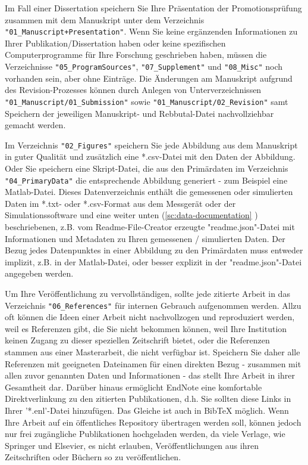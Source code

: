 Im Fall einer Dissertation speichern Sie Ihre Präsentation der Promotionsprüfung zusammen mit dem Manuskript unter dem Verzeichnis \texttt{"01\_Manuscript+Presentation"}. Wenn Sie keine ergänzenden Informationen zu Ihrer Publikation/Dissertation haben oder keine spezifischen Computerprogramme für Ihre Forschung geschrieben haben, müssen die Verzeichnisse \linebreak
\texttt{"05\_ProgramSources"}, \texttt{"07\_Supplement"} und \texttt{"08\_Misc"} noch vorhanden sein, aber ohne Einträge. Die Änderungen am Manuskript aufgrund des Revision-Prozesses können durch Anlegen von Unterverzeichnissen \texttt{"01\_Manuscript/01\_Submission"} sowie \texttt{"01\_Manuscript/02\_Revision"} samt Speichern der jeweiligen Manuskript- und Rebbutal-Datei nachvollziehbar gemacht werden.

Im Verzeichnis \texttt{"02\_Figures"} speichern Sie jede Abbildung aus dem Manuskript in guter Qualität und zusätzlich eine *.csv-Datei mit den Daten der Abbildung. Oder Sie speichern eine Skript-Datei, die aus den Primärdaten im Verzeichnis \texttt{"04\_PrimaryData"} die entsprechende Abbildung generiert - zum Beispiel eine Matlab-Datei. Dieses Datenverzeichnis enthält die gemessenen oder simulierten Daten im *.txt- oder *.csv-Format aus dem Messgerät oder der Simulationssoftware und eine weiter unten (\ref{sc:data-documentation}  ) beschriebenen, z.B. vom Readme-File-Creator erzeugte "readme.json"-Datei mit Informationen und Metadaten zu Ihren gemessenen / simulierten Daten. Der Bezug jedes Datenpunktes in einer Abbildung zu den Primärdaten muss entweder implizit, z.B. in der Matlab-Datei, oder besser explizit in der "readme.json"-Datei angegeben werden.

Um Ihre Veröffentlichung zu vervollständigen, sollte jede zitierte Arbeit in das Verzeichnis \texttt{"06\_References"} für internen Gebrauch aufgenommen werden. Allzu oft können die Ideen einer Arbeit nicht nachvollzogen und reproduziert werden, weil es Referenzen gibt, die Sie nicht bekommen können, weil Ihre
Institution keinen Zugang zu dieser speziellen Zeitschrift bietet, oder die Referenzen stammen aus einer Masterarbeit, die nicht verfügbar ist. Speichern Sie daher alle Referenzen mit geeigneten Dateinamen für einen direkten Bezug - zusammen mit allen zuvor genannten Daten und Informationen - das stellt Ihre Arbeit in ihrer Gesamtheit dar. Darüber hinaus ermöglicht EndNote eine komfortable Direktverlinkung zu den zitierten Publikationen, d.h. Sie sollten diese Links in Ihrer '*.enl'-Datei hinzufügen. Das Gleiche ist auch in BibTeX
möglich. Wenn Ihre Arbeit auf ein öffentliches Repository übertragen werden soll, können jedoch nur frei zugängliche Publikationen hochgeladen werden, da viele Verlage, wie Springer und Elsevier, es nicht erlauben, Veröffentlichungen aus ihren Zeitschriften oder Büchern so zu veröffentlichen.

